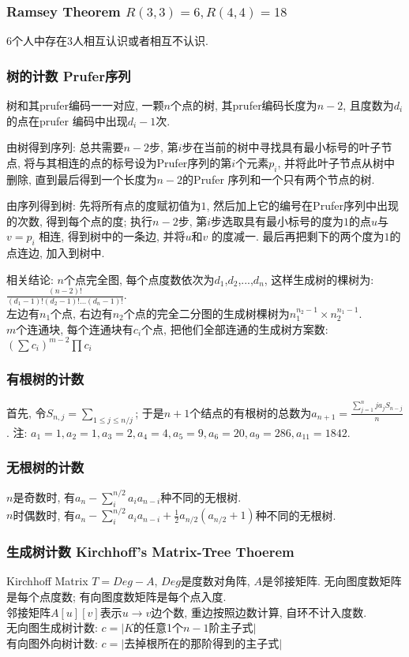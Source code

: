 \subsubsection{Ramsey Theorem $R(3,3)=6, R(4,4)=18$}
    $6$个人中存在$3$人相互认识或者相互不认识.

\subsubsection{树的计数 Prufer序列}
    树和其prufer编码一一对应, 一颗$n$个点的树, 其prufer编码长度为${n-2}$, 且度数为$d_i$ 的点在prufer 编码中出现${d_i -1}$次. 
    \par 由树得到序列: 总共需要$n-2$步, 第$i$步在当前的树中寻找具有最小标号的叶子节点, 将与其相连的点的标号设为Prufer序列的第$i$个元素$p_i$, 并将此叶子节点从树中删除, 直到最后得到一个长度为$n-2$的Prufer 序列和一个只有两个节点的树. 
    \par 由序列得到树: 先将所有点的度赋初值为$1$, 然后加上它的编号在Prufer序列中出现的次数, 得到每个点的度; 执行$n-2$步, 第$i$步选取具有最小标号的度为$1$的点$u$与$v=p_i$ 相连, 得到树中的一条边, 并将$u$和$v$ 的度减一. 最后再把剩下的两个度为$1$的点连边, 加入到树中. 
    \par 相关结论: $n$个点完全图, 每个点度数依次为$d_1$,$d_2$,...,$d_n$, 这样生成树的棵树为: ${\frac{(n-2)!}{(d_1-1)!(d_2-1)!...(d_n-1)!}}$.\\
    左边有$n_1$个点, 右边有$n_2$个点的完全二分图的生成树棵树为$n_1^{n_2-1}\times n_2^{n_1-1}$. \\
    $m$个连通块, 每个连通块有$c_i$个点, 把他们全部连通的生成树方案数: $(\sum c_i)^{m-2}\prod c_i$
\subsubsection{有根树的计数}\noindent
    首先, 令$S_{n,j}=\sum_{1\leq j\leq n/j}$; 于是$n+1$个结点的有根树的总数为$ a_{n+1}=\frac{\sum_{j=1}^nja_jS_{n-j}}{n}$. 注: $a_1=1,a_2=1,a_3=2,a_4=4,a_5=9,a_6=20,a_9=286,a_{11}=1842$. 
\subsubsection{无根树的计数}\noindent
    $n$是奇数时, 有$a_n-\sum_{i}^{n/2}a_ia_{n-i}$种不同的无根树. \\
    $n$时偶数时, 有$a_n-\sum_{i}^{n/2}a_ia_{n-i}+\frac{1}{2}a_{n/2}(a_{n/2}+1)$种不同的无根树. 
\subsubsection{生成树计数 Kirchhoff's Matrix-Tree Thoerem}
    Kirchhoff Matrix $T=Deg-A$, $Deg$是度数对角阵, $A$是邻接矩阵. 无向图度数矩阵是每个点度数; 有向图度数矩阵是每个点入度.\\
    邻接矩阵$A[u][v]$表示$u\rightarrow v$边个数, 重边按照边数计算, 自环不计入度数.\\
    无向图生成树计数: $c=|K$的任意1个$n−1$阶主子式$|$\\
    有向图外向树计数: $c=|$去掉根所在的那阶得到的主子式$|$
